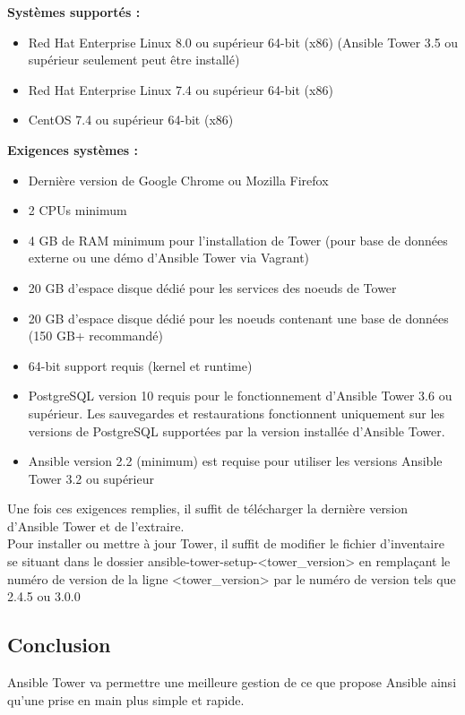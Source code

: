 \documentclass[12pt]{article}
\begin{document}
\textbf{Systèmes supportés :}
\begin{itemize}
    \item Red Hat Enterprise Linux 8.0 ou supérieur 64-bit (x86) (Ansible Tower 3.5 ou supérieur seulement peut être installé)
    \item Red Hat Enterprise Linux 7.4 ou supérieur 64-bit (x86)
    \item CentOS 7.4 ou supérieur 64-bit (x86)
\end{itemize}

\textbf{Exigences systèmes :}
\begin{itemize}
    \item Dernière version de Google Chrome ou Mozilla Firefox
    \item 2 CPUs minimum
    \item 4 GB de RAM minimum pour l'installation de Tower (pour base de données externe ou une démo d'Ansible Tower via Vagrant)
    \item 20 GB d'espace disque dédié pour les services des noeuds de Tower
    \item 20 GB d'espace disque dédié pour les noeuds contenant une base de données (150 GB+ recommandé)
    \item 64-bit support requis (kernel et runtime)
    \item PostgreSQL version 10 requis pour le fonctionnement d'Ansible Tower 3.6 ou supérieur. Les sauvegardes et restaurations fonctionnent uniquement sur les versions de PostgreSQL supportées par la version installée d'Ansible Tower.
    \item Ansible version 2.2 (minimum) est requise pour utiliser les versions Ansible Tower 3.2 ou supérieur
\end{itemize}

Une fois ces exigences remplies, il suffit de télécharger la dernière version d'Ansible Tower et de l'extraire.
\vspace{0.5cm}
\\
Pour installer ou mettre à jour Tower, il suffit de modifier le fichier d'inventaire se situant dans le dossier ansible-tower-setup-<tower\_version> en remplaçant le numéro de version de la ligne <tower\_version> par le numéro de version tels que 2.4.5 ou 3.0.0

\subsection{Conclusion}
Ansible Tower va permettre une meilleure gestion de ce que propose Ansible ainsi qu'une prise en main plus simple et rapide.
\end{document}
